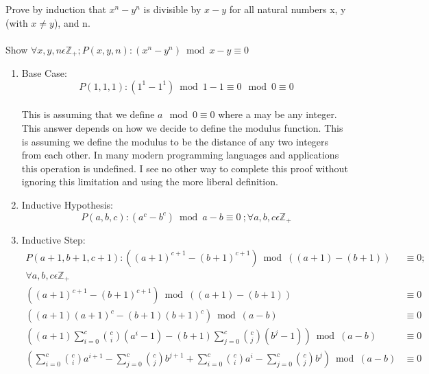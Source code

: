 \documentclass[12pt]{article}
\begin{document}
Prove by induction that \begin{math}x^n - y^n\end{math} is divisible by \begin{math}x - y\end{math} for all natural numbers x, y (with \begin{math}x \not = y\end{math}), and n.\\\\
\noindent Show \begin{math}\forall x,y,n \epsilon \mathbb{Z}_+ ; P(x,y,n):(x^n-y^n)\bmod{x-y} \equiv 0\end{math}
\begin{enumerate}
\item Base Case:\\
\[P(1,1,1):(1^1 - 1^1)\bmod{1 - 1}\equiv 0 \mod 0 \equiv 0\]\\
This is assuming that we define \begin{math}a \mod 0 \equiv 0\end{math} where a may be any integer. This answer depends on how we decide to define the modulus function. This is assuming we define the modulus to be the distance of any two integers from each other. In many modern programming languages and applications this operation is undefined. I see no other way to complete this proof without ignoring this limitation and using the more liberal definition.
\item Inductive Hypothesis:
\[P(a,b,c):(a^c - b^c)\bmod{a - b}\equiv 0\ ; \forall a,b,c \epsilon \mathbb{Z}_+\]
\item Inductive Step:\\
\begin{align*}
P(a+1,b+1,c+1):((a+1)^{c+1} - (b+1)^{c+1})\bmod{((a + 1) - (b + 1))}&\equiv 0 ;\\
\forall a,b,c \epsilon \mathbb{Z}_+\\
((a+1)^{c+1} - (b+1)^{c+1})\bmod{((a + 1) - (b + 1))}&\equiv 0\\
((a+1)(a+1)^{c} - (b+1)(b+1)^{c})\bmod{(a-b)}&\equiv 0\\
((a+1)\sum\limits_{i = 0}^{c} {c \choose i} (a^i - 1) - (b+1)\sum\limits_{j = 0}^{c} {c \choose j} (b^j - 1))\bmod{(a-b)} &\equiv 0\\
(\sum\limits_{i = 0}^{c} {c \choose i} a^{i+1} - \sum\limits_{j = 0}^{c} {c \choose j} b^{j+1} + \sum\limits_{i = 0}^{c} {c \choose i} a^i - \sum\limits_{j = 0}^{c} {c \choose j} b^j)\bmod{(a-b)} &\equiv 0\\

\end{align*}
\end{enumerate}
\end{document}
